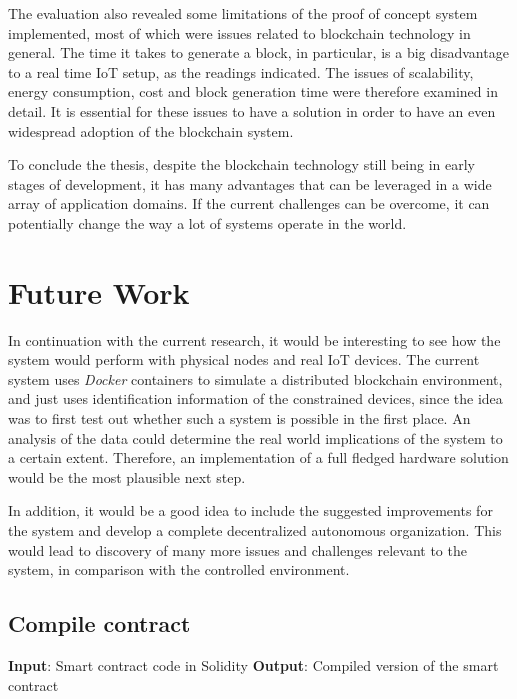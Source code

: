 \documentclass[english]{tktltiki}
\begin{document}
The evaluation also revealed some limitations of the proof of concept system implemented, most of which were issues related to blockchain technology in general. The time it takes to generate a block, in particular, is a big disadvantage to a real time IoT setup, as the readings indicated. The issues of scalability, energy consumption, cost and block generation time were therefore examined in detail. It is essential for these issues to have a solution in order to have an even widespread adoption of the blockchain system. 

To conclude the thesis, despite the blockchain technology still being in early stages of development, it has many advantages that can be leveraged in a wide array of application domains. If the current challenges can be overcome, it can potentially change the way a lot of systems operate in the world.
\newpage
\section{Future Work}

In continuation with the current research, it would be interesting to see how the system would perform with physical nodes and real IoT devices. The current system uses \textit{Docker} containers to simulate a distributed blockchain environment, and just uses identification information of the constrained devices, since the idea was to first test out whether such a system is possible in the first place. An analysis of the data could determine the real world implications of the system to a certain extent. Therefore, an implementation of a full fledged hardware solution would be the most plausible next step.

In addition, it would be a good idea to include the suggested improvements for the system and develop a complete decentralized autonomous organization. This would lead to discovery of many more issues and challenges relevant to the system, in comparison with the controlled environment. 


\pagebreak
\nocite{*}



\lastpage

\appendices
{}
\subsection*{Compile contract}
\textbf{Input}: Smart contract code in Solidity \newline
\textbf{Output}: Compiled version of the smart contract \newline
\end{document}
